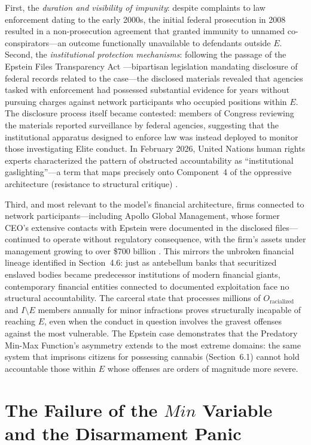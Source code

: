 First, the \textit{duration and visibility of impunity}: despite complaints to law enforcement dating to the early 2000s, the initial federal prosecution in 2008 resulted in a non-prosecution agreement that granted immunity to unnamed co-conspirators---an outcome functionally unavailable to defendants outside $E$. Second, the \textit{institutional protection mechanisms}: following the passage of the Epstein Files Transparency Act \cite{epsteinact}---bipartisan legislation mandating disclosure of federal records related to the case---the disclosed materials revealed that agencies tasked with enforcement had possessed substantial evidence for years without pursuing charges against network participants who occupied positions within $E$. The disclosure process itself became contested: members of Congress reviewing the materials reported surveillance by federal agencies, suggesting that the institutional apparatus designed to enforce law was instead deployed to monitor those investigating Elite conduct. In February 2026, United Nations human rights experts characterized the pattern of obstructed accountability as ``institutional gaslighting''---a term that maps precisely onto Component~4 of the oppressive architecture (resistance to structural critique) \cite{ohchr2026}.

Third, and most relevant to the model's financial architecture, firms connected to network participants---including Apollo Global Management, whose former CEO's extensive contacts with Epstein were documented in the disclosed files---continued to operate without regulatory consequence, with the firm's assets under management growing to over \$700 billion \cite{apolloepstein}. This mirrors the unbroken financial lineage identified in Section~4.6: just as antebellum banks that securitized enslaved bodies became predecessor institutions of modern financial giants, contemporary financial entities connected to documented exploitation face no structural accountability. The carceral state that processes millions of $O_{\text{racialized}}$ and $I \setminus E$ members annually for minor infractions proves structurally incapable of reaching $E$, even when the conduct in question involves the gravest offenses against the most vulnerable. The Epstein case demonstrates that the Predatory Min-Max Function's asymmetry extends to the most extreme domains: the same system that imprisons citizens for possessing cannabis (Section~6.1) cannot hold accountable those within $E$ whose offenses are orders of magnitude more severe.

\section{The Failure of the \texorpdfstring{$Min$}{Min} Variable and the Disarmament Panic}

